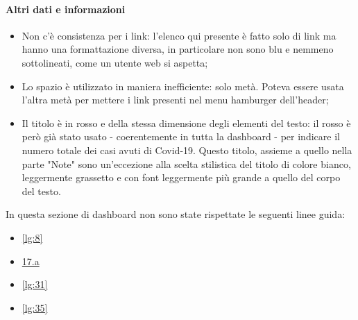 \paragraph{Altri dati e informazioni}
\begin{itemize}
    \item Non c'è consistenza per i link: l'elenco qui presente è fatto solo di link ma hanno una formattazione diversa, in particolare non sono blu e nemmeno sottolineati, come un utente web si aspetta;
    \item Lo spazio è utilizzato in maniera inefficiente: solo metà. Poteva essere usata l'altra metà per mettere i link presenti nel menu hamburger dell'header;
    \item Il titolo è in rosso e della stessa dimensione degli elementi del testo: il rosso è però già stato usato - coerentemente in tutta la dashboard - per indicare il numero totale dei casi avuti di Covid-19. Questo titolo, assieme a quello nella parte "Note" sono un'eccezione alla scelta stilistica del titolo di colore bianco, leggermente grassetto e con font leggermente più grande a quello del corpo del testo.
\end{itemize}
In questa sezione di dashboard non sono state rispettate le seguenti linee guida:
\begin{itemize}
    \item \ref{lg:8}
    \item \hyperref[lg:17.a]{17.a}
    \item \ref{lg:31}
    \item \ref{lg:35}
\end{itemize}

